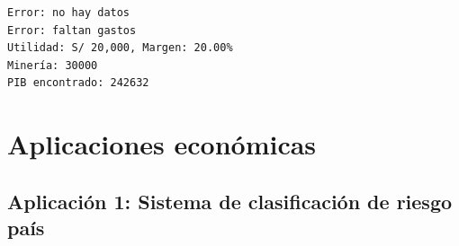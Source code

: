 \documentclass[
  doc,
  floatsintext,
  longtable,
  a4paper,
  nolmodern,
  notxfonts,
  notimes,
  12pt,
  colorlinks=true,linkcolor=blue,citecolor=blue,urlcolor=blue]{apa7}
\begin{document}
\begin{verbatim}
Error: no hay datos
Error: faltan gastos
Utilidad: S/ 20,000, Margen: 20.00%
Minería: 30000
PIB encontrado: 242632
\end{verbatim}

\section{Aplicaciones económicas}\label{aplicaciones-econuxf3micas-1}

\subsection{Aplicación 1: Sistema de clasificación de riesgo
país}\label{aplicaciuxf3n-1-sistema-de-clasificaciuxf3n-de-riesgo-pauxeds}
\end{document}
